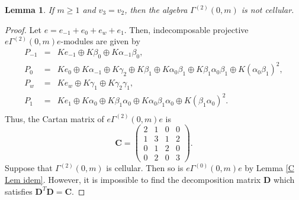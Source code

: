 \documentclass[12pt]{amsart}
\newtheorem{lem}[thm]{Lemma}
\numberwithin{equation}{thm}
\newcommand\bC{\mathbf C}
\newcommand\bD{\mathbf D}
\begin{document}
\begin{lem}\label{D V-2}
If $m\ge1$ and $v_3=v_2$, then the algebra $\Gamma^{(2)}(0,m)$ is not cellular.
\end{lem}
\begin{proof}
Let $e=e_{-1}+e_0+e_{w}+e_{1}$. Then, indecomposable projective $e\Gamma^{(2)}(0,m)e$-modules are given by
\[\begin{array}{lcl}
P_{-1} &=& Ke_{-1}\oplus K \beta_{0}\oplus K\alpha_{-1}\beta_{0}, \\
P_{0} &=& Ke_0\oplus K\alpha_{-1}\oplus K\gamma_{2} \oplus K\beta_{1}\oplus K\alpha_0\beta_1\oplus K\beta_1\alpha_0\beta_1\oplus K(\alpha_{0}\beta_{1})^2, \\
P_{w} &=& Ke_{w} \oplus K\gamma_{1}\oplus K\gamma_2\gamma_1, \\
P_{1} &=& Ke_{1} \oplus  K\alpha_{0}\oplus  K\beta_{1}\alpha_{0}\oplus K\alpha_0\beta_1\alpha_0\oplus K(\beta_1\alpha_0)^2. \\
\end{array} \]
Thus, the Cartan matrix of $e\Gamma^{(2)}(0,m)e$ is
\[ \bC=\begin{pmatrix}
2 & 1 & 0 & 0 \\
1 & 3 & 1 & 2 \\
0 & 1 & 2 & 0 \\
0 & 2 & 0 & 3 \end{pmatrix}. \]
Suppose that $\Gamma^{(2)}(0,m)$ is cellular. Then so is $e\Gamma^{(0)}(0,m)e$ by Lemma \ref{C Lem idem}. 
However, it is impossible to find the decomposition matrix $\bD$ which satisfies $\bD^T\bD=\bC$.
\end{proof}
\end{document}
